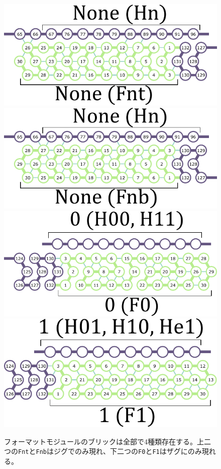 \documentclass[a4j,11pt]{article}
\begin{document}
\begin{figure}[tb]
  \centering
   \includegraphics[width=0.6\linewidth]{fig/svg/Fnt_1.pdf}\\
 \vspace*{10mm}
   \includegraphics[width=0.6\linewidth]{fig/svg/Fnb_1.pdf}\\
 \vspace*{10mm}
   \includegraphics[width=0.6\linewidth]{fig/svg/F0_1.pdf}\\
 \vspace*{10mm}
   \includegraphics[width=0.6\linewidth]{fig/svg/F1_1.pdf}
 \caption{フォーマットモジュールのブリックは全部で4種類存在する。上二つの\texttt{Fnt}と\texttt{Fnb}はジグでのみ現れ、下二つの\texttt{F0}と\texttt{F1}はザグにのみ現れる。}
 \label{fig:formatters}
\end{figure}
\end{document}
